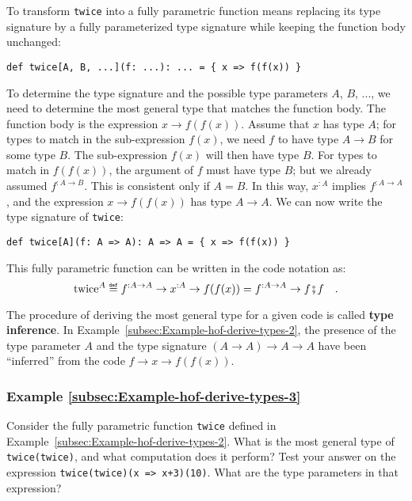 To transform \lstinline!twice! into a fully parametric function means
replacing its type signature by a fully parameterized type signature
while keeping the function body unchanged:
\begin{lstlisting}
def twice[A, B, ...](f: ...): ... = { x => f(f(x)) }
\end{lstlisting}

To determine the type signature and the possible type parameters $A$,
$B$, ..., we need to determine the most general type that matches
the function body. The function body is the expression $x\rightarrow f(f(x))$.
Assume that $x$ has type $A$; for types to match in the sub-expression
$f(x)$, we need $f$ to have type $A\rightarrow B$ for some type
$B$. The sub-expression $f(x)$ will then have type $B$. For types
to match in $f(f(x))$, the argument of $f$ must have type $B$;
but we already assumed $f^{:A\rightarrow B}$. This is consistent
only if $A=B$. In this way, $x^{:A}$ implies $f^{:A\rightarrow A}$,
and the expression $x\rightarrow f(f(x))$ has type $A\rightarrow A$.
We can now write the type signature of \lstinline!twice!:
\begin{lstlisting}
def twice[A](f: A => A): A => A = { x => f(f(x)) }
\end{lstlisting}
This fully parametric function can be written in the code notation
as:
\begin{equation}
\text{twice}^{A}\triangleq f^{:A\rightarrow A}\rightarrow x^{:A}\rightarrow f(f(x))=f^{:A\rightarrow A}\rightarrow f\bef f\quad.\label{eq:hof-def-of-twice-in-math-notation}
\end{equation}

The procedure of deriving the most general type for a given code is
called \textbf{type inference}. In Example~\ref{subsec:Example-hof-derive-types-2},
the presence of the type parameter $A$ and the type signature $\left(A\rightarrow A\right)\rightarrow A\rightarrow A$
have been \textsf{``}inferred\textsf{''} from the code $f\rightarrow x\rightarrow f(f(x))$.

\subsubsection{Example \label{subsec:Example-hof-derive-types-3}\ref{subsec:Example-hof-derive-types-3}}

Consider the fully parametric function \lstinline!twice! defined
in Example~\ref{subsec:Example-hof-derive-types-2}. What is the
most general type of \lstinline!twice(twice)!, and what computation
does it perform? Test your answer on the expression \lstinline!twice(twice)(x => x+3)(10)!.
What are the type parameters in that expression?

